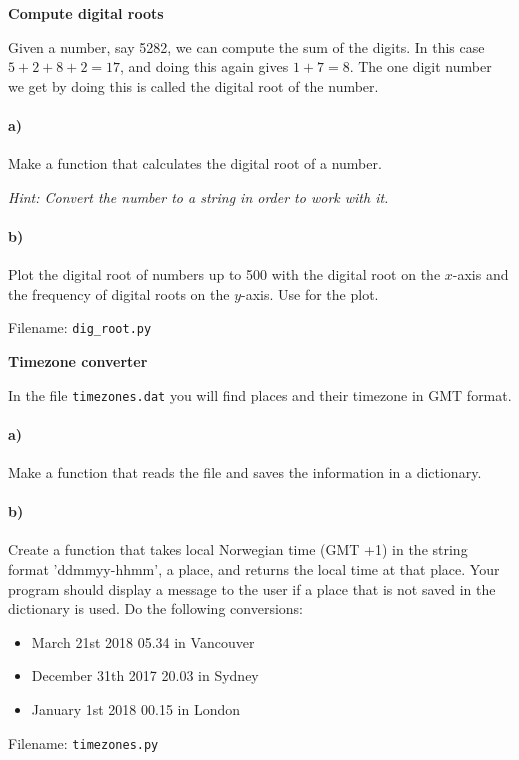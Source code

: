 \begin{Problem}{\textbf{Compute digital roots}}

\noindent Given a number, say 5282, we can compute the sum of the digits. In this case
$5+2+8+2=17$, and doing this again gives $1+7=8$. The one digit number we get by
doing this is called the digital root of the number.

\paragraph{a)}
Make a function that calculates the digital root of a number.

\emph{Hint: Convert the number to a string in order to work with it.}

\paragraph{b)}
Plot the digital root of numbers up to 500 with the digital root on the $x$-axis and
the frequency of digital roots on the $y$-axis. Use  for the plot.

Filename: \texttt{dig\_root.py}
\end{Problem}



\begin{Problem}{\textbf{Timezone converter}}

\noindent In the file \texttt{timezones.dat} you will find places and their timezone in
GMT format.

\paragraph{a)}
Make a function that reads the file and saves the information in a dictionary.

\paragraph{b)}
Create a function that takes local Norwegian time (GMT +1) in the string format
'ddmmyy-hhmm', a place, and returns the local time at that place. Your program
should display a message to the user if a place that is not saved in the
dictionary is used. Do the following conversions:
\begin{itemize}
    \item March 21st 2018 05.34 in Vancouver
    \item December 31th 2017 20.03 in Sydney
    \item January 1st 2018 00.15 in London
\end{itemize}

Filename: \texttt{timezones.py}
\end{Problem}
